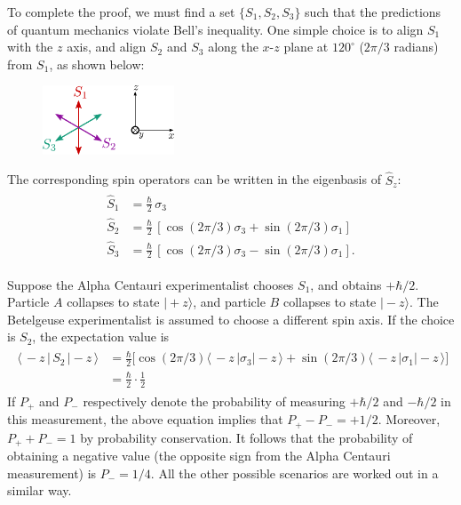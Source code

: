 \documentclass[pra,12pt]{revtex4}
\begin{document}
To complete the proof, we must find a set $\{S_1, S_2, S_3\}$ such
that the predictions of quantum mechanics violate Bell's inequality.
One simple choice is to align $S_1$ with the $z$ axis, and align $S_2$
and $S_3$ along the $x$-$z$ plane at $120^\circ$ ($2\pi/3$ radians)
from $S_1$, as shown below:

\begin{figure}[h]
  \centering\includegraphics[width=0.35\textwidth]{bellaxes}
\end{figure}

The corresponding spin operators can be written in the eigenbasis of
$\hat{S}_z$:
\begin{align}
  \begin{aligned}\hat{S}_1 &= \frac{\hbar}{2} \, \sigma_3 \\ \hat{S}_2 &= \frac{\hbar}{2} \, \left[\cos(2\pi/3) \sigma_3 + \sin(2\pi/3)\sigma_1\right]  \\   \hat{S}_3 &= \frac{\hbar}{2} \, \left[\cos(2\pi/3) \sigma_3 - \sin(2\pi/3)\sigma_1\right].\end{aligned}
\end{align}

Suppose the Alpha Centauri experimentalist chooses $S_1$, and obtains
$+\hbar/2$.  Particle $A$ collapses to state $|\!+\!z\rangle$, and
particle $B$ collapses to state $|\!-\!z\rangle$.  The Betelgeuse
experimentalist is assumed to choose a different spin axis.  If the
choice is $S_2$, the expectation value is
\begin{align}
  \begin{aligned}\langle\, - z \, | \, S_2 \,|-\!z\,\rangle &= \frac{\hbar}{2} \Big[\cos(2\pi/3) \langle\,- z\,|\sigma_3| - \!z\,\rangle + \sin(2\pi/3)\langle\,- z\,|\sigma_1|-\!z\,\rangle\Big]\\ &= \frac{\hbar}{2} \cdot \frac{1}{2} \end{aligned}
\end{align}
If $P_+$ and $P_-$ respectively denote the probability of measuring
$+\hbar/2$ and $-\hbar/2$ in this measurement, the above equation
implies that $P_+ - P_- = + 1/2$.  Moreover, $P_+ + P_- = 1$ by
probability conservation.  It follows that the probability of
obtaining a negative value (the opposite sign from the Alpha Centauri
measurement) is $P_- = 1/4$.  All the other possible scenarios are
worked out in a similar way.
\end{document}

